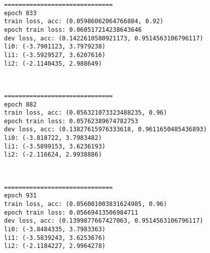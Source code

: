 \documentclass[11pt]{article}
\begin{document}
    \begin{Verbatim}[commandchars=\\\{\}]
==============================
epoch 833
train loss, acc: (0.05986062064766884, 0.92)
epoch train loss: 0.060517214238643646
dev loss, acc: (0.1422610580921173, 0.9514563106796117)
li0: (-3.7901123, 3.7979238)
li1: (-3.5929527, 3.6207616)
li2: (-2.1140435, 2.988649)

    \end{Verbatim}

    \begin{center}
    \end{center}
    { \hspace*{\fill} \\}
    
    \begin{Verbatim}[commandchars=\\\{\}]
==============================
epoch 882
train loss, acc: (0.056321073323488235, 0.96)
epoch train loss: 0.05762389674782753
dev loss, acc: (0.13827615976333618, 0.9611650485436893)
li0: (-3.818722, 3.7983482)
li1: (-3.5899153, 3.6236193)
li2: (-2.116624, 2.9938886)

    \end{Verbatim}

    \begin{center}
    \end{center}
    { \hspace*{\fill} \\}
    
    \begin{Verbatim}[commandchars=\\\{\}]
==============================
epoch 931
train loss, acc: (0.056001003831624985, 0.96)
epoch train loss: 0.05669413506984711
dev loss, acc: (0.1399877667427063, 0.9514563106796117)
li0: (-3.8484335, 3.7983363)
li1: (-3.5839243, 3.6253676)
li2: (-2.1184227, 2.9964278)

    \end{Verbatim}

    \begin{center}
    \end{center}
    { \hspace*{\fill} \\}
    
\end{document}
